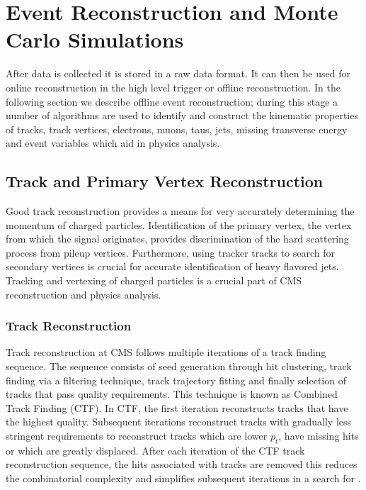\chapter{Event Reconstruction and Monte Carlo Simulations}
After data is collected it is stored in a raw data format.
It can then be used for online reconstruction in the high level trigger
or offline reconstruction. 
In the following section we describe offline event reconstruction;
during this stage a number of algorithms are used to identify and
construct the kinematic properties %
of tracks, track vertices,  electrons, muons, taus, jets, missing transverse energy and 
event variables which aid in physics analysis.  
\section{Track and Primary Vertex Reconstruction}
Good track reconstruction provides a means for very accurately determining
the momentum of charged particles.
Identification of the primary vertex, the vertex from
which the signal originates, provides discrimination of the hard scattering process
from pileup vertices.
Furthermore, using tracker tracks to search for secondary vertices
is crucial for accurate identification of heavy flavored jets.
Tracking and vertexing of charged particles is a crucial part of CMS reconstruction
and physics analysis.
\subsection{Track Reconstruction}
\label{sec:TrackReco}
Track reconstruction at CMS follows multiple iterations of a track finding sequence.
The sequence consists of seed generation through hit clustering,
track finding via a filtering technique, track trajectory fitting and finally
selection of tracks that pass quality requirements. 
This technique is known as Combined Track Finding (CTF).
In CTF, the first iteration reconstructs tracks that
have the highest quality. Subsequent iterations reconstruct
tracks with gradually less stringent requirements 
to reconstruct tracks which are lower $p_{t}$, have missing hits or which are greatly displaced.
After each iteration of the CTF track reconstruction sequence, the hits
associated with tracks are removed this reduces the combinatorial complexity
and simplifies subsequent iterations in a search for .

